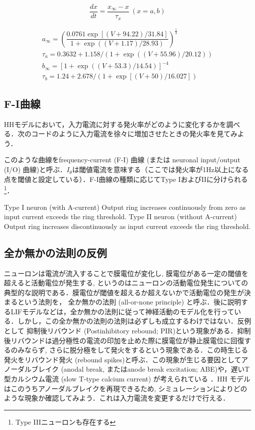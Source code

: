 \documentclass[titlepage]{ltjsbook}
\begin{document}
\begin{equation}
\frac{dx}{dt}=\frac{x_\infty-x}{\tau_x}\ (x=a, b)
\end{equation}

\begin{equation}
\begin{array}{l}
a_{\infty}=\left(\dfrac{0.0761 \exp [(V+94.22)/31.84]}{1+\exp ((V+1.17)/28.93)}\right)^{\frac{1}{3}}\\
\tau_a=0.3632+1.158 /(1+\exp ((V+55.96)/20.12)) \\
b_{\infty}=\left[1+\exp ((V+53.3)/14.54)\right]^{-4}\\
\tau_b=1.24+2.678 /(1+\exp [(V+50)/16.027])
\end{array}
\end{equation}

\subsection{F-I曲線}
HHモデルにおいて，入力電流に対する発火率がどのように変化するかを調べる．次のコードのように入力電流を徐々に増加させたときの発火率を見てみよう．

このような曲線をfrequency-current (F-I) 曲線 (または neuronal input/output (I/O) 曲線)と呼ぶ．$I_\theta$は閾値電流を意味する（ここでは発火率が1Hz以上になる点を閾値と設定している）．F-I曲線の種類に応じてType IおよびIIに分けられる\footnote{Type IIIニューロンも存在する}．


Type I neuron (with A-current) Output ring increases continuously from zero as input current exceeds the ring threshold. 
Type II neuron (without A-current)
Output ring increases discontinuously as input current exceeds the ring threshold.

\subsection{全か無かの法則の反例}
ニューロンは電流が流入することで膜電位が変化し, 膜電位がある一定の閾値を超えると活動電位が発生する, というのはニューロンの活動電位発生についての典型的な説明である．膜電位が閾値を超えるか超えないかで活動電位の発生が決まるという法則を， 全か無かの法則 (all-or-none principle) と呼ぶ．後に説明するLIFモデルなどは，全か無かの法則に従って神経活動のモデル化を行っている．しかし，この全か無かの法則の法則は必ずしも成立するわけではない．反例として 抑制後リバウンド (Postinhibitory rebound; PIR)という現象がある．抑制後リバウンドは過分極性の電流の印加を止めた際に膜電位が静止膜電位に回復するのみならず, さらに脱分極をして発火をするという現象である．この時生じる発火をリバウンド発火 (rebound spikes)と呼ぶ．この現象が生じる要因としてアノーダルブレイク (anodal break, またはanode break excitation; ABE)や，遅いT型カルシウム電流 (slow T-type calcium current) が考えられている \citep{Chik2004-ka}．HH モデルはこのうちアノーダルブレイクを再現できるため, シミュレーションによりどのような現象か確認してみよう．これは入力電流を変更するだけで行える．
\end{document}
